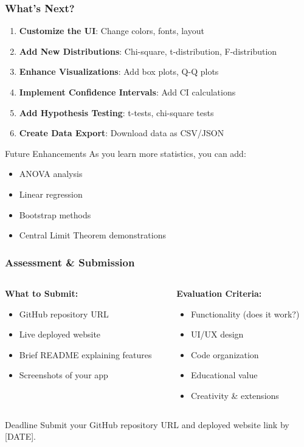 \documentclass[aspectratio=169]{beamer}
\begin{document}
\begin{frame}
\frametitle{What's Next?}
\begin{enumerate}
\item \textbf{Customize the UI}: Change colors, fonts, layout
\item \textbf{Add New Distributions}: Chi-square, t-distribution, F-distribution
\item \textbf{Enhance Visualizations}: Add box plots, Q-Q plots
\item \textbf{Implement Confidence Intervals}: Add CI calculations
\item \textbf{Add Hypothesis Testing}: t-tests, chi-square tests
\item \textbf{Create Data Export}: Download data as CSV/JSON
\end{enumerate}

\begin{exampleblock}{Future Enhancements}
As you learn more statistics, you can add:
\begin{itemize}
\item ANOVA analysis
\item Linear regression
\item Bootstrap methods
\item Central Limit Theorem demonstrations
\end{itemize}
\end{exampleblock}
\end{frame}

\begin{frame}
\frametitle{Assessment \& Submission}
\begin{columns}
\begin{column}{0.5\textwidth}
\textbf{What to Submit:}
\begin{itemize}
\item GitHub repository URL
\item Live deployed website
\item Brief README explaining features
\item Screenshots of your app
\end{itemize}
\end{column}
\begin{column}{0.5\textwidth}
\textbf{Evaluation Criteria:}
\begin{itemize}
\item Functionality (does it work?)
\item UI/UX design
\item Code organization
\item Educational value
\item Creativity \& extensions
\end{itemize}
\end{column}
\end{columns}

\begin{alertblock}{Deadline}
Submit your GitHub repository URL and deployed website link by [DATE].
\end{alertblock}
\end{frame}
\end{document}
